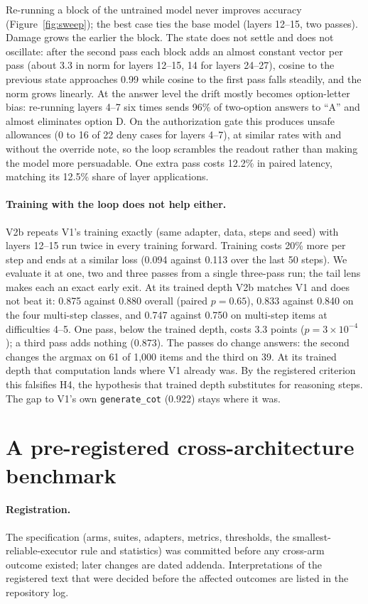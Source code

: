 \documentclass[11pt]{article}
\newcommand{\cotR}{\texttt{generate\_cot}}
\begin{document}
Re-running a block of the untrained model never improves accuracy (Figure~\ref{fig:sweep}); the best
case ties the base model (layers 12--15, two passes). Damage grows the earlier the block. The state
does not settle and does not oscillate: after the second pass each block adds an almost constant
vector per pass (about 3.3 in norm for layers 12--15, 14 for layers 24--27), cosine to the previous
state approaches 0.99 while cosine to the first pass falls steadily, and the norm grows linearly.
At the answer level the drift mostly becomes option-letter bias: re-running layers 4--7 six times
sends 96\% of two-option answers to ``A'' and almost eliminates option D. On the authorization gate
this produces unsafe allowances (0 to 16 of 22 deny cases for layers 4--7), at similar rates with and
without the override note, so the loop scrambles the readout rather than making the model more
persuadable. One extra pass costs 12.2\% in paired latency, matching its 12.5\% share of layer
applications.

\paragraph{Training with the loop does not help either.} V2b repeats V1's training exactly (same
adapter, data, steps and seed) with layers 12--15 run twice in every training forward. Training
costs 20\% more per step and ends at a similar loss (0.094 against 0.113 over the last 50
steps). We evaluate it at one, two and three passes from a single three-pass run; the tail lens
makes each an exact early exit. At its trained depth V2b matches V1 and does not beat it: 0.875
against 0.880 overall (paired $p=0.65$), 0.833 against 0.840 on the four multi-step classes, and
0.747 against 0.750 on multi-step items at difficulties 4--5. One pass, below the trained depth,
costs 3.3 points ($p=3\times10^{-4}$); a third pass adds nothing (0.873). The passes do change answers:
the second changes the argmax on 61 of 1,000 items and the third on 39. At its trained depth that
computation lands where V1 already was. By the registered criterion this falsifies H4, the
hypothesis that trained depth substitutes for reasoning steps. The gap to V1's own \cotR{} (0.922)
stays where it was.

\section{A pre-registered cross-architecture benchmark}
\label{sec:bench}

\paragraph{Registration.} The specification (arms, suites, adapters, metrics, thresholds, the
smallest-reliable-executor rule and statistics) was committed before any cross-arm outcome existed;
later changes are dated addenda. Interpretations of the registered text that were decided before the
affected outcomes are listed in the repository log.
\end{document}
